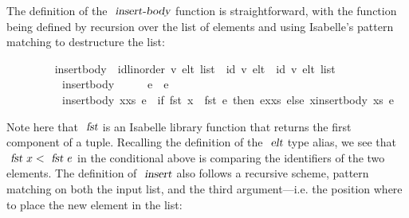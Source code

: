 \documentclass[acmlarge,review,anonymous]{acmart}\settopmatter{printfolios=true}
\begin{document}
The definition of the $\isa{insert-body}$ function is straightforward, with the function being defined by recursion over the list of elements and using Isabelle's pattern matching to destructure the list:
\\
\begin{isabellebody}
\ \ \ \ \ \ \ \  insert{\isacharunderscore}body\ {\isacharcolon}{\isacharcolon}\ {\isachardoublequoteopen}{\isacharparenleft}{\isacharprime}id{\isacharcolon}{\isacharcolon}{\isacharbraceleft}linorder{\isacharbraceright}{\isacharcomma}\ {\isacharprime}v{\isacharparenright}\ elt\ list\ {\isasymRightarrow}\ {\isacharparenleft}{\isacharprime}id{\isacharcomma}\ {\isacharprime}v{\isacharparenright}\ elt\ {\isasymRightarrow}\ {\isacharparenleft}{\isacharprime}id{\isacharcomma}\ {\isacharprime}v{\isacharparenright}\ elt\ list{\isachardoublequoteclose}\ \isanewline
\ \ \ \ \ \ \ \ \ \ {\isachardoublequoteopen}insert{\isacharunderscore}body\ {\isacharbrackleft}{\isacharbrackright}\ \ \ \ \ e\ {\isacharequal}\ {\isacharbrackleft}e{\isacharbrackright}{\isachardoublequoteclose}\ {\isacharbar}\isanewline
\ \ \ \ \ \ \ \ \ \ {\isachardoublequoteopen}insert{\isacharunderscore}body\ {\isacharparenleft}x{\isacharhash}xs{\isacharparenright}\ e\ {\isacharequal}\ {\isacharparenleft}if\ fst\ x\ {\isacharless}\ fst\ e\ then\ e{\isacharhash}x{\isacharhash}xs\ else\ x{\isacharhash}insert{\isacharunderscore}body\ xs\ e{\isacharparenright}{\isachardoublequoteclose}
\end{isabellebody}
\vspace{\baselineskip}
Note here that $\isa{fst}$ is an Isabelle library function that returns the first component of a tuple.
Recalling the definition of the $\isa{elt}$ type alias, we see that $\isa{fst}\ x < \isa{fst}\ e$ in the conditional above is comparing the identifiers of the two elements.
The definition of $\isa{insert}$ also follows a recursive scheme, pattern matching on both the input list, and the third argument---i.e. the position where to place the new element in the list:
\\
\end{document}
